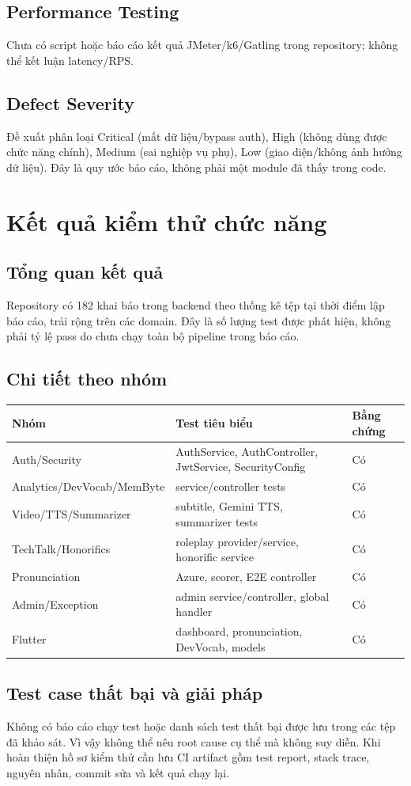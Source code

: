 \documentclass[12pt,a4paper]{report}
\newcommand{\code}[1]{\texttt{\detokenize{#1}}}
\begin{document}
\subsection{Performance Testing} Chưa có script hoặc báo cáo kết quả JMeter/k6/Gatling trong repository; không thể kết luận latency/RPS.\newline
\subsection{Defect Severity} Đề xuất phân loại Critical (mất dữ liệu/bypass auth), High (không dùng được chức năng chính), Medium (sai nghiệp vụ phụ), Low (giao diện/không ảnh hưởng dữ liệu). Đây là quy ước báo cáo, không phải một module đã thấy trong code.
\section{Kết quả kiểm thử chức năng}
\subsection{Tổng quan kết quả}
Repository có 182 khai báo \code{@Test} trong backend theo thống kê tệp tại thời điểm lập báo cáo, trải rộng trên các domain. Đây là số lượng test được phát hiện, không phải tỷ lệ pass do chưa chạy toàn bộ pipeline trong báo cáo.
\subsection{Chi tiết theo nhóm}
\begin{longtable}{p{}p{}p{}}\toprule
Nhóm & Test tiêu biểu & Bằng chứng\\\midrule
Auth/Security & AuthService, AuthController, JwtService, SecurityConfig & Có\\
Analytics/DevVocab/MemByte & service/controller tests & Có\\
Video/TTS/Summarizer & subtitle, Gemini TTS, summarizer tests & Có\\
TechTalk/Honorifics & roleplay provider/service, honorific service & Có\\
Pronunciation & Azure, scorer, E2E controller & Có\\
Admin/Exception & admin service/controller, global handler & Có\\
Flutter & dashboard, pronunciation, DevVocab, models & Có\\
\bottomrule\end{longtable}
\subsection{Test case thất bại và giải pháp}
Không có báo cáo chạy test hoặc danh sách test thất bại được lưu trong các tệp đã khảo sát. Vì vậy không thể nêu root cause cụ thể mà không suy diễn. Khi hoàn thiện hồ sơ kiểm thử cần lưu CI artifact gồm test report, stack trace, nguyên nhân, commit sửa và kết quả chạy lại.
\end{document}
